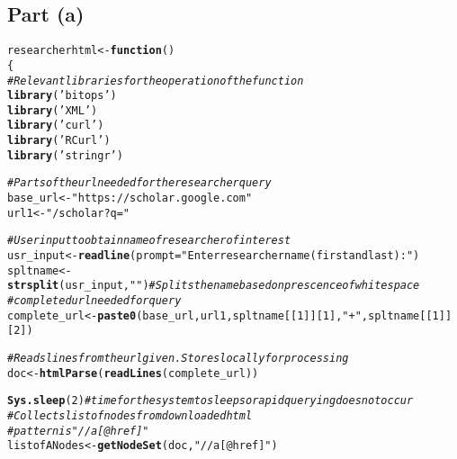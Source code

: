 \documentclass{article}\usepackage[]{graphicx}\usepackage[]{color}
\makeatletter
\newcommand{\hlnum}[1]{\textcolor[rgb]{0.686,0.059,0.569}{#1}}%
\newcommand{\hlstr}[1]{\textcolor[rgb]{0.192,0.494,0.8}{#1}}%
\newcommand{\hlcom}[1]{\textcolor[rgb]{0.678,0.584,0.686}{\textit{#1}}}%
\newcommand{\hlstd}[1]{\textcolor[rgb]{0.345,0.345,0.345}{#1}}%
\newcommand{\hlkwa}[1]{\textcolor[rgb]{0.161,0.373,0.58}{\textbf{#1}}}%
\newcommand{\hlkwb}[1]{\textcolor[rgb]{0.69,0.353,0.396}{#1}}%
\newcommand{\hlkwc}[1]{\textcolor[rgb]{0.333,0.667,0.333}{#1}}%
\newcommand{\hlkwd}[1]{\textcolor[rgb]{0.737,0.353,0.396}{\textbf{#1}}}%
\newenvironment{kframe}{%
 \def\at@end@of@kframe{}%
 \ifinner\ifhmode%
  \def\at@end@of@kframe{\end{minipage}}%
  \begin{minipage}{\columnwidth}%
 \fi\fi%
 \def\FrameCommand##1{\hskip\@totalleftmargin \hskip-\fboxsep
 \colorbox{shadecolor}{##1}\hskip-\fboxsep
     \hskip-\linewidth \hskip-\@totalleftmargin \hskip\columnwidth}%
 \MakeFramed {\advance\hsize-\width
   \@totalleftmargin\z@ \linewidth\hsize
   \@setminipage}}%
 {\par\unskip\endMakeFramed%
 \at@end@of@kframe}
\newenvironment{knitrout}{}{} %
\makeatother
\begin{document}
\subsection{Part (a)}
\begin{knitrout}
\color{fgcolor}\begin{kframe}
\begin{alltt}
\hlstd{researcherhtml}\hlkwb{<-}\hlkwa{function}\hlstd{()}
\hlstd{\{}
  \hlcom{#Relevant libraries for the operation of the function}
  \hlkwd{library}\hlstd{(}\hlstr{'bitops'}\hlstd{)}
  \hlkwd{library}\hlstd{(}\hlstr{'XML'}\hlstd{)}
  \hlkwd{library}\hlstd{(}\hlstr{'curl'}\hlstd{)}
  \hlkwd{library}\hlstd{(}\hlstr{'RCurl'}\hlstd{)}
  \hlkwd{library}\hlstd{(}\hlstr{'stringr'}\hlstd{)}

  \hlcom{#Parts of the url needed for the researcher query}
  \hlstd{base_url}\hlkwb{<-}\hlstr{"https://scholar.google.com"}
  \hlstd{url1}\hlkwb{<-}\hlstr{"/scholar?q="}

  \hlcom{#User input to obtain name of researcher of interest}
  \hlstd{usr_input}\hlkwb{<-}\hlkwd{readline}\hlstd{(}\hlkwc{prompt}\hlstd{=}\hlstr{"Enter researcher name (first and last): "}\hlstd{)}
  \hlstd{spltname}\hlkwb{<-}\hlkwd{strsplit}\hlstd{(usr_input,} \hlstr{" "}\hlstd{)} \hlcom{#Splits the name based on prescence of whitespace}
  \hlcom{#completed url needed for query}
  \hlstd{complete_url}\hlkwb{<-}\hlkwd{paste0}\hlstd{(base_url,url1,spltname[[}\hlnum{1}\hlstd{]][}\hlnum{1}\hlstd{],}\hlstr{"+"}\hlstd{,spltname[[}\hlnum{1}\hlstd{]][}\hlnum{2}\hlstd{])}

  \hlcom{#Reads lines from the url given. Stores locally for processing}
  \hlstd{doc}\hlkwb{<-}\hlkwd{htmlParse}\hlstd{(}\hlkwd{readLines}\hlstd{(complete_url))}

  \hlkwd{Sys.sleep}\hlstd{(}\hlnum{2}\hlstd{)} \hlcom{#time for the system to sleep so rapid querying does not occur}
  \hlcom{#Collects list of nodes from downloaded html}
  \hlcom{#pattern is "//a[@href]"}
  \hlstd{listofANodes}\hlkwb{<-}\hlkwd{getNodeSet}\hlstd{(doc,} \hlstr{"//a[@href]"}\hlstd{)}


\end{alltt}
\end{kframe}
\end{knitrout}
\end{document}
